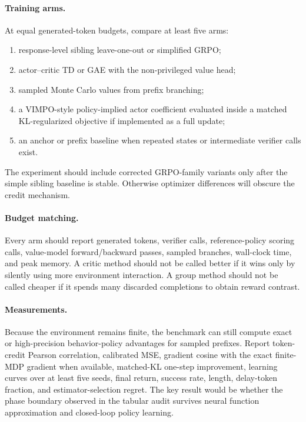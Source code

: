 \documentclass[11pt]{article}
\newcommand{\grpo}{\textsc{GRPO}}
\newcommand{\vimpo}{\textsc{VIMPO}}
\begin{document}
\paragraph{Training arms.}
At equal generated-token budgets, compare at least five arms:
\begin{enumerate}[leftmargin=*]
\item response-level sibling leave-one-out or simplified \grpo;
\item actor--critic TD or GAE with the non-privileged value head;
\item sampled Monte Carlo values from prefix branching;
\item a \vimpo-style policy-implied actor coefficient evaluated inside a
matched KL-regularized objective if implemented as a full update;
\item an anchor or prefix baseline when repeated states or intermediate
verifier calls exist.
\end{enumerate}
The experiment should include corrected \grpo-family variants only after the
simple sibling baseline is stable. Otherwise optimizer differences will obscure
the credit mechanism.

\paragraph{Budget matching.}
Every arm should report generated tokens, verifier calls, reference-policy
scoring calls, value-model forward/backward passes, sampled branches,
wall-clock time, and peak memory. A critic method should not be called better
if it wins only by silently using more environment interaction. A group method
should not be called cheaper if it spends many discarded completions to obtain
reward contrast.

\paragraph{Measurements.}
Because the environment remains finite, the benchmark can still compute exact
or high-precision behavior-policy advantages for sampled prefixes. Report
token-credit Pearson correlation, calibrated MSE, gradient cosine with the
exact finite-MDP gradient when available, matched-KL one-step improvement,
learning curves over at least five seeds, final return, success rate, length,
delay-token fraction, and estimator-selection regret. The key result would be
whether the phase boundary observed in the tabular audit survives neural
function approximation and closed-loop policy learning.
\end{document}
